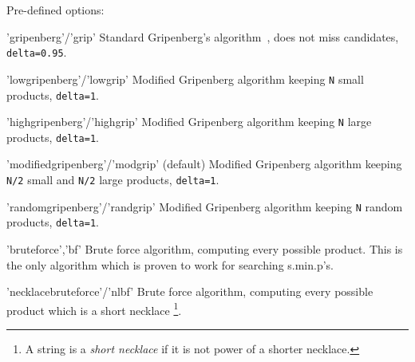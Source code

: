 Pre-defined options:
\begin{param}
    \item['gripenberg'/'grip'] Standard Gripenberg's algorithm~\cite{Grip96}, does not miss candidates, \texttt{delta=0.95}.
    
    \item['lowgripenberg'/'lowgrip']  Modified Gripenberg algorithm keeping \texttt{N} small products, \texttt{delta=1}.

    \item['highgripenberg'/'highgrip'] Modified Gripenberg algorithm keeping \texttt{N} large products, \texttt{delta=1}.
    
    \item['modifiedgripenberg'/'modgrip'] (default) Modified Gripenberg algorithm  keeping \texttt{N/2} small and \texttt{N/2} large products, \texttt{delta=1}.
    
    \item['randomgripenberg'/'randgrip'] Modified Gripenberg algorithm keeping \texttt{N} random products, \texttt{delta=1}.
    
    \item['bruteforce','bf'] Brute force algorithm, computing every possible product.
    This is the only algorithm which is proven to work for searching s.min.p's.
    
    \item['necklacebruteforce'/'nlbf'] Brute force algorithm, computing every possible product which is a short necklace%
    \footnote{A string is a \emph{short necklace} if it is not power of a shorter necklace.}.
\end{param}

